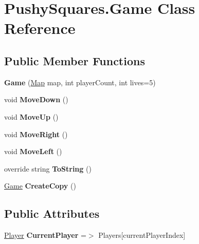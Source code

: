 \hypertarget{class_pushy_squares_1_1_game}{}\section{Pushy\+Squares.\+Game Class Reference}
\label{class_pushy_squares_1_1_game}
\subsection*{Public Member Functions}
\begin{DoxyCompactItemize}
\item 
\mbox{\label{class_pushy_squares_1_1_game_a20cbb5621570a6f0698036e9a3524ea4}} 
{\bfseries Game} (\hyperlink{struct_pushy_squares_1_1_map}{Map} map, int player\+Count, int lives=5)
\item 
\mbox{\label{class_pushy_squares_1_1_game_ace62c258e788abd02cac7f7f97d1e40f}} 
void {\bfseries Move\+Down} ()
\item 
\mbox{\label{class_pushy_squares_1_1_game_a0ea9f497adfae3b1ef1e3407bf993342}} 
void {\bfseries Move\+Up} ()
\item 
\mbox{\label{class_pushy_squares_1_1_game_ab237fb8915ef66a97ea8c1e12e267971}} 
void {\bfseries Move\+Right} ()
\item 
\mbox{\label{class_pushy_squares_1_1_game_a1752197b499b28397cf13acc948e5dd7}} 
void {\bfseries Move\+Left} ()
\item 
\mbox{\label{class_pushy_squares_1_1_game_a67cf00221e9dfb2ee334c93b9a2bb4a5}} 
override string {\bfseries To\+String} ()
\item 
\mbox{\label{class_pushy_squares_1_1_game_ac765f459b7161bfee9bde9c2da8003a0}} 
\hyperlink{class_pushy_squares_1_1_game}{Game} {\bfseries Create\+Copy} ()
\end{DoxyCompactItemize}
\subsection*{Public Attributes}
\begin{DoxyCompactItemize}
\item 
\mbox{\label{class_pushy_squares_1_1_game_adc4edd01c789f48b3324070e9219ef64}} 
\hyperlink{class_pushy_squares_1_1_player}{Player} {\bfseries Current\+Player} =$>$ Players\mbox{[}current\+Player\+Index\mbox{]}
\end{DoxyCompactItemize}
